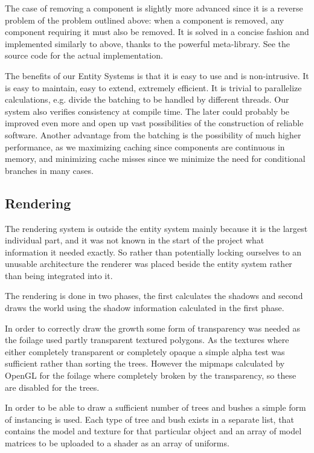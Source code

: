 The case of removing a component is slightly more advanced since it is a reverse problem of the problem outlined above: when a component is removed, any component requiring it must also be removed. It is solved in a concise fashion and implemented similarly to above, thanks to the powerful meta-library. See the source code for the actual implementation.

The benefits of our Entity Systems is that it is easy to use and is non-intrusive. It is easy to maintain, easy to extend, extremely efficient. It is trivial to parallelize calculations, e.g. divide the batching to be handled by different threads. Our system also verifies consistency at compile time. The later could probably be improved even more and open up vast possibilities of the construction of reliable software. Another advantage from the batching is the possibility of much higher performance, as we maximizing caching since components are continuous in memory, and minimizing cache misses since we minimize the need for conditional branches in many cases.

\newpage
\subsection{Rendering}
The rendering system is outside the entity system mainly because it is the largest individual part, and it was not known in the start of the project what information it needed exactly. So rather than potentially locking ourselves to an unusable architecture the renderer was placed beside the entity system rather than being integrated into it.

The rendering is done in two phases, the first calculates the shadows and second draws the world using the shadow information calculated in the first phase.

In order to correctly draw the growth some form of transparency was needed as the foilage used partly transparent textured polygons. As the textures where either completely transparent or completely opaque a simple alpha test was sufficient rather than sorting the trees. However the mipmaps calculated by OpenGL for the foilage where completely broken by the transparency, so these are disabled for the trees.

In order to be able to draw a sufficient number of trees and bushes a simple form of instancing is used. Each type of tree and bush exists in a separate list, that contains the model and texture for that particular object and an array of model matrices to be uploaded to a shader as an array of uniforms.

